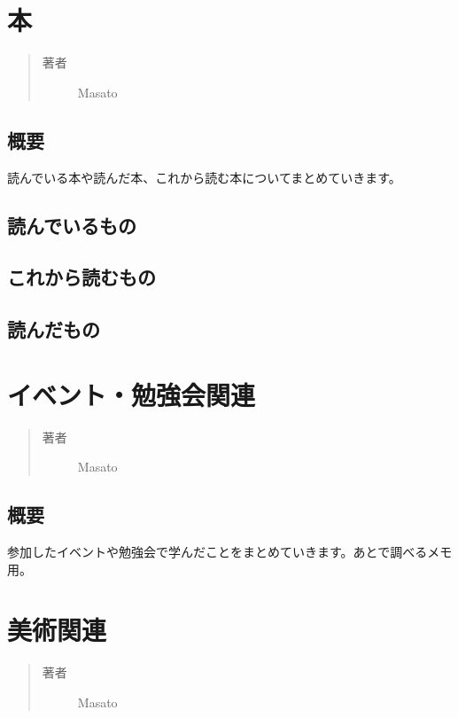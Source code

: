 \documentclass[letterpaper,10pt,dvipdfmx]{sphinxmanual}
\begin{document}
\chapter{本}
\label{books:id1}\label{books::doc}\begin{quote}\begin{description}
\item[{著者}] \leavevmode
Masato

\end{description}\end{quote}


\section{概要}
\label{books:id2}
読んでいる本や読んだ本、これから読む本についてまとめていきます。


\section{読んでいるもの}
\label{books:id3}

\section{これから読むもの}
\label{books:id4}

\section{読んだもの}
\label{books:id5}

\chapter{イベント・勉強会関連}
\label{events:id1}\label{events::doc}\begin{quote}\begin{description}
\item[{著者}] \leavevmode
Masato

\end{description}\end{quote}


\section{概要}
\label{events:id2}
参加したイベントや勉強会で学んだことをまとめていきます。あとで調べるメモ用。


\chapter{美術関連}
\label{hobby_arts:id1}\label{hobby_arts::doc}\begin{quote}\begin{description}
\item[{著者}] \leavevmode
Masato

\end{description}\end{quote}
\end{document}

